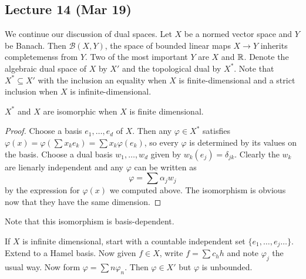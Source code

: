 \documentclass[10pt, twoside]{article}
\begin{document}
    \subsection{Lecture 14 (Mar 19)}

    We continue our discussion of dual spaces. Let $X$ be a normed vector space and $Y$ be Banach. Then $\mathcal{B}(X,Y)$, the space of bounded linear maps $X \to Y$ inherits completemenss from $Y$. Two of the most important $Y$ are $X$ and $\mathbb{R}$. Denote the algebraic dual space of $X$ by $X'$ and the topological dual by $X^*$. Note that $X^* \subseteq X'$ with the inclusion an equality when $X$ is finite-dimensional and a strict inclusion when $X$ is infinite-dimensional. 

    \begin{lem}
        $X^*$ and $X$ are isomorphic when $X$ is finite dimensional.
        \begin{proof}
            Choose a basis $e_1, \ldots, e_d$ of $X$. Then any $\varphi \in X^*$ satisfies $\varphi(x) = \varphi \left( \sum x_ke_k \right) = \sum x_k \varphi(e_k)$, so every $\varphi$ is determined by its values on the basis. Choose a dual basis $w_1, \ldots, w_d$ given by $w_k(e_j) = \delta_{jk}$. Clearly the $w_k$ are lienarly independent and any $\varphi$ can be written as \[\varphi = \sum \alpha_j w_j\] by the expression for $\varphi(x)$ we computed above. The isomorphism is obvious now that they have the same dimension.
        \end{proof}
    \end{lem}

    \begin{rmk}
        Note that this isomorphism is basis-dependent.
    \end{rmk}

    \begin{exm}
        If $X$ is infinite dimensional, start with a countable independent set $\{e_1, \ldots, e_j \ldots \}$. Extend to a Hamel basis. Now given $f \in X$, write $f = \sum c_h h$ and note $\varphi_j$ the usual way. Now form $\varphi = \sum n \varphi_n$. Then $\varphi \in X'$ but $\varphi$ is unbounded.
    \end{exm}
\end{document}
